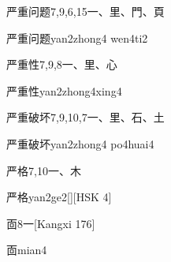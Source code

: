 \begin{Entry}{严重问题}{7,9,6,15}{⼀、⾥、⾨、⾴}
  \begin{Phonetics}{严重问题}{yan2zhong4 wen4ti2}
  \end{Phonetics}
\end{Entry}

\begin{Entry}{严重性}{7,9,8}{⼀、⾥、⼼}
  \begin{Phonetics}{严重性}{yan2zhong4xing4}
  \end{Phonetics}
\end{Entry}

\begin{Entry}{严重破坏}{7,9,10,7}{⼀、⾥、⽯、⼟}
  \begin{Phonetics}{严重破坏}{yan2zhong4 po4huai4}
  \end{Phonetics}
\end{Entry}

\begin{Entry}{严格}{7,10}{⼀、⽊}
  \begin{Phonetics}{严格}{yan2ge2}[][HSK 4]
  \end{Phonetics}
\end{Entry}

\begin{Entry}{靣}{8}{⼀}[Kangxi 176]
  \begin{Phonetics}{靣}{mian4}
  \end{Phonetics}
\end{Entry}


